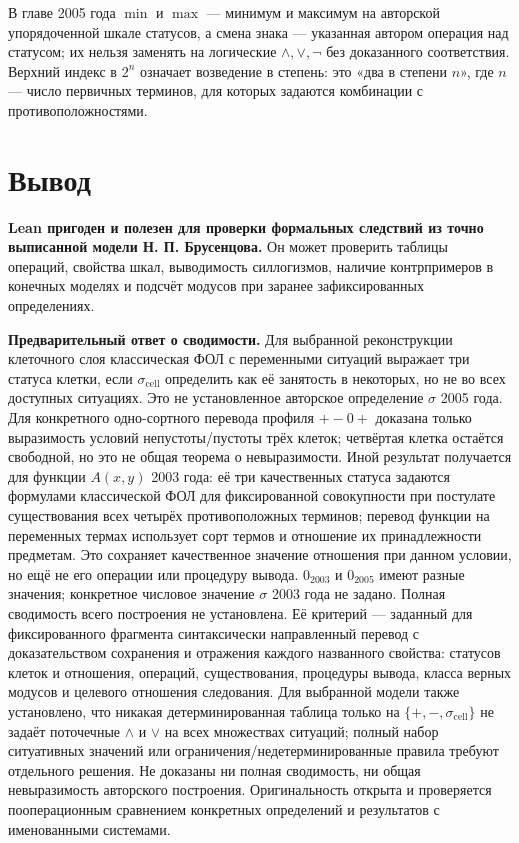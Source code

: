 \documentclass[12pt,a4paper]{article}
\begin{document}
В главе 2005 года \(\min\) и \(\max\) — минимум и максимум на авторской упорядоченной шкале статусов, а смена знака — указанная автором операция над статусом; их нельзя заменять на логические \(\land,\lor,\neg\) без доказанного соответствия. Верхний индекс в \(2^n\) означает возведение в степень: это «два в степени \(n\)», где \(n\) — число первичных терминов, для которых задаются комбинации с противоположностями.

\section{Вывод}

\textbf{Lean пригоден и полезен для проверки формальных следствий из точно выписанной модели Н. П. Брусенцова.} Он может проверить таблицы операций, свойства шкал, выводимость силлогизмов, наличие контрпримеров в конечных моделях и подсчёт модусов при заранее зафиксированных определениях.

\textbf{Предварительный ответ о сводимости.} Для выбранной реконструкции клеточного слоя классическая ФОЛ с переменными ситуаций выражает три статуса клетки, если \(\sigma_{\mathrm{cell}}\) определить как её занятость в некоторых, но не во всех доступных ситуациях. Это не установленное авторское определение \(\sigma\) 2005 года. Для конкретного одно-сортного перевода профиля \(+-0+\) доказана только выразимость условий непустоты/пустоты трёх клеток; четвёртая клетка остаётся свободной, но это не общая теорема о невыразимости. Иной результат получается для функции \(A(x,y)\) 2003 года: её три качественных статуса задаются формулами классической ФОЛ для фиксированной совокупности при постулате существования всех четырёх противоположных терминов; перевод функции на переменных термах использует сорт термов и отношение их принадлежности предметам. Это сохраняет качественное значение отношения при данном условии, но ещё не его операции или процедуру вывода. \(0_{2003}\) и \(0_{2005}\) имеют разные значения; конкретное числовое значение \(\sigma\) 2003 года не задано. Полная сводимость всего построения не установлена. Её критерий — заданный для фиксированного фрагмента синтаксически направленный перевод с доказательством сохранения и отражения каждого названного свойства: статусов клеток и отношения, операций, существования, процедуры вывода, класса верных модусов и целевого отношения следования. Для выбранной модели также установлено, что никакая детерминированная таблица только на \(\{+,-,\sigma_{\mathrm{cell}}\}\) не задаёт поточечные \(\land\) и \(\lor\) на всех множествах ситуаций; полный набор ситуативных значений или ограничения/недетерминированные правила требуют отдельного решения. Не доказаны ни полная сводимость, ни общая невыразимость авторского построения. Оригинальность открыта и проверяется пооперационным сравнением конкретных определений и результатов с именованными системами.
\end{document}
